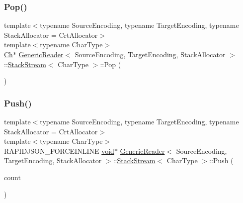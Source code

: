 \mbox{\label{classGenericReader_1_1StackStream_a4c654610639025799a533b188cdfeb62}} 
\subsubsection{\texorpdfstring{Pop()}{Pop()}}
{\footnotesize\ttfamily template$<$typename Source\+Encoding, typename Target\+Encoding, typename Stack\+Allocator = Crt\+Allocator$>$ \\
template$<$typename Char\+Type$>$ \\
\hyperlink{classGenericReader_1_1StackStream_a8b6ba64b97ed5f79f17d96428fd50ec0}{Ch}$\ast$ \hyperlink{classGenericReader}{Generic\+Reader}$<$ Source\+Encoding, Target\+Encoding, Stack\+Allocator $>$\+::\hyperlink{classGenericReader_1_1StackStream}{Stack\+Stream}$<$ Char\+Type $>$\+::Pop (\begin{DoxyParamCaption}{ }\end{DoxyParamCaption})\hspace{0.3cm}{\ttfamily [inline]}}

\mbox{\label{classGenericReader_1_1StackStream_adc439f24eb3dd3c8c5b9203716d41bd9}} 
\subsubsection{\texorpdfstring{Push()}{Push()}}
{\footnotesize\ttfamily template$<$typename Source\+Encoding, typename Target\+Encoding, typename Stack\+Allocator = Crt\+Allocator$>$ \\
template$<$typename Char\+Type$>$ \\
R\+A\+P\+I\+D\+J\+S\+O\+N\+\_\+\+F\+O\+R\+C\+E\+I\+N\+L\+I\+NE \hyperlink{imgui__impl__opengl3__loader_8h_ac668e7cffd9e2e9cfee428b9b2f34fa7}{void}$\ast$ \hyperlink{classGenericReader}{Generic\+Reader}$<$ Source\+Encoding, Target\+Encoding, Stack\+Allocator $>$\+::\hyperlink{classGenericReader_1_1StackStream}{Stack\+Stream}$<$ Char\+Type $>$\+::Push (\begin{DoxyParamCaption}\item[{\hyperlink{rapidjson_8h_a5ed6e6e67250fadbd041127e6386dcb5}{Size\+Type}}]{count }\end{DoxyParamCaption})\hspace{0.3cm}{\ttfamily [inline]}}

